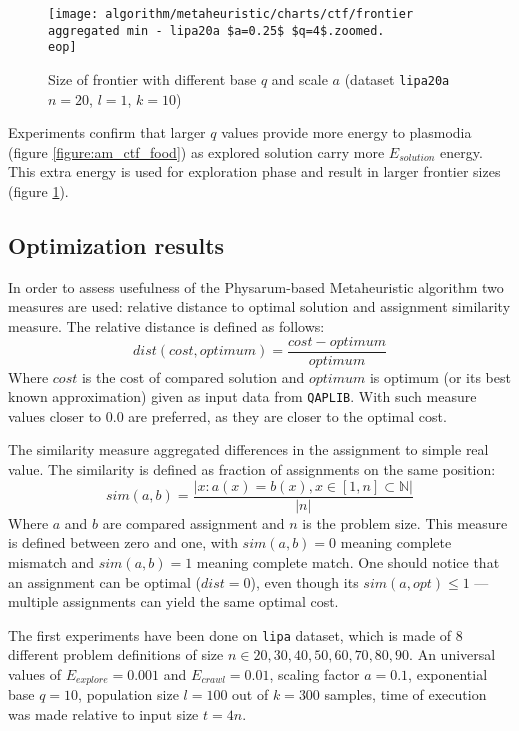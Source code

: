 \begin{figure}
  \centering

  \texttt{[image: algorithm/metaheuristic/charts/ctf/frontier aggregated min - lipa20a \$a=0.25\$ \$q=4\$.zoomed.\\eop]}
  
  \caption{Size of frontier with different base $q$ and scale $a$ (dataset \texttt{lipa20a} $n=20$, $l=1$, $k=10$)}
  \label{figure:am_ctf_frontier}
\end{figure}

Experiments confirm that larger $q$ values provide more energy to plasmodia (figure \ref{figure:am_ctf_food}) as explored solution carry more $E_{solution}$ energy. This extra energy is used for exploration phase and result in larger frontier sizes (figure \ref{figure:am_ctf_frontier}).


\subsection{Optimization results}

In order to assess usefulness of the Physarum-based Metaheuristic algorithm two measures are used: relative distance to optimal solution and assignment similarity measure. The relative distance is defined as follows:
\begin{equation}
  dist(cost, optimum) = \frac{cost - optimum}{optimum}
\end{equation}
Where $cost$ is the cost of compared solution and $optimum$ is optimum (or its best known approximation) given as input data from \texttt{QAPLIB}. With such measure values closer to $0.0$ are preferred, as they are closer to the optimal cost.

The similarity measure aggregated differences in the assignment to simple real value. The similarity is defined as fraction of assignments on the same position:
\begin{equation}
  sim(a, b) = \frac{| x : a(x) = b(x), x \in [1, n] \subset \mathbb{N}|}{|n|}
\end{equation}
Where $a$ and $b$ are compared assignment and $n$ is the problem size. This measure is defined between zero and one, with $sim(a, b) = 0$ meaning complete mismatch and $sim(a, b) = 1$ meaning complete match. One should notice that an assignment can be optimal ($dist=0$), even though its $sim(a, opt) \leq 1$ --- multiple assignments can yield the same optimal cost.

The first experiments have been done on \texttt{lipa} dataset, which is made of 8 different problem definitions of size $n \in {20, 30, 40, 50, 60, 70, 80, 90}$. An universal values of $E_{explore}=0.001$ and $E_{crawl}=0.01$, scaling factor $a=0.1$, exponential base $q=10$, population size $l=100$ out of $k=300$ samples, time of execution was made relative to input size $t=4n$.

